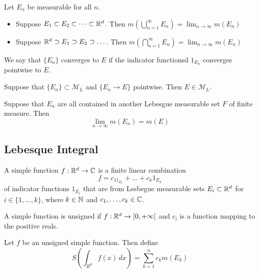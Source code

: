 \documentclass[a4paper]{article}
\begin{document}
\begin{thm} Let $E_n$ be measurable for all $n$. 
\begin{itemize}
\item Suppose $E_1\subset E_2\subset\dots\subset\mathbb{R}^d$. Then $m\left(\bigcup_{n=1}^\infty E_n\right)=\lim_{n\to\infty}m(E_n)$
\item Suppose $\mathbb{R}^d\supset E_1\supset E_2\supset\dots$. Then $m\left(\bigcap_{n=1}^\infty E_n\right)=\lim_{n\to\infty}m(E_n)$
\end{itemize}
\end{thm}

\begin{defn} We say that $\{E_n\}$ converges to $E$ if the indicator functionsd $1_{E_n}$ converges pointwise to $E$. 
\end{defn}

\begin{thm} Suppose that $\{E_n\}\subset\mathcal{M}_L$ and $\{E_n\to E\}$ pointwise. Then $E\in\mathcal{M}_L$. 
\end{thm}

\begin{thm} Suppose that $E_n$ are all contained in another Lebesgue measurable set $F$ of finite measure. Then $$\lim_{n\to\infty}m(E_n)=m(E)$$
\end{thm}

\subsection{Lebesque Integral}
\begin{defn} A simple function $f:\mathbb{R}^d\to\mathbb{C}$ is a finite linear combination $$f=c_11_{E_1}+\dots+c_k1_{E_k}$$ of indicator functions $1_{E_i}$ that are from Lesbegue measurable sets $E_i\subset\mathbb{R}^d$ for $i\in\{1,\dots,k\}$, where $k\in\mathbb{N}$ and $c_1,\dots,c_k\in\mathbb{C}$. 
\end{defn}

\begin{defn} A simple function is unsigned if $f:\mathbb{R}^d\to[0,+\infty]$ and $c_i$ is a function mapping to the positive reals. 
\end{defn}

\begin{defn} Let $f$ be an unsigned simple function. Then define $$S\left(\int_{R^d}f(x)\,dx\right)=\sum_{k=1}^nc_km(E_k)$$
\end{defn}
\end{document}
